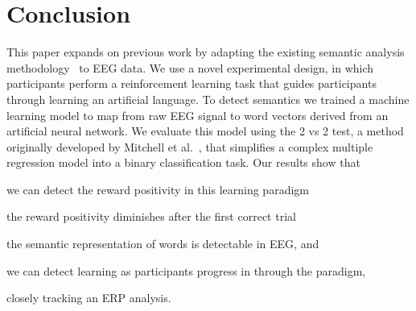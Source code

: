 \section{Conclusion}

This paper expands on previous work by adapting the existing semantic analysis 
methodology~\cite{Mitchell2008,Sudre2012} to EEG data.  We use a novel 
experimental design, in which participants perform a reinforcement learning 
task that guides participants through learning an artificial language. To 
detect semantics we trained a machine learning model to map from raw EEG signal 
to word vectors derived from an artificial neural network. We evaluate this 
model using the 2 vs 2 test, a method originally developed by Mitchell et 
al.~\cite{Mitchell2008}, that simplifies a complex multiple regression model 
into a binary classification task. Our results show that 
\begin{inparaenum}[(1)]
  \item we can detect the reward positivity in this learning paradigm
  \item the reward positivity diminishes after the first correct trial
  \item the semantic representation of words is detectable in EEG, and \item we 
  can detect learning as participants progress in through the paradigm,
\end{inparaenum}
closely tracking an ERP analysis.

